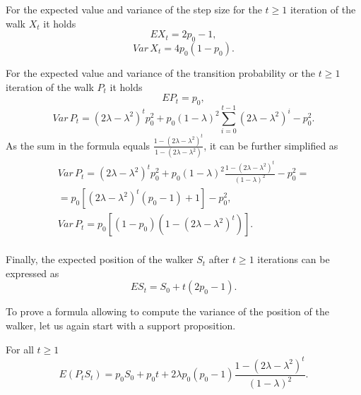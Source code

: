 \documentclass[runningheads]{CMSIM}
\begin{document}
    For the expected value and variance of the step size for the $t\ge1$
    iteration of the walk $X_{t}$ it holds~\cite{ja2019apmat}
    \begin{equation}
        EX_{t}=2p_{0}-1,\label{eq:e_x_t_sr}
    \end{equation}
    \begin{equation}
        Var\,X_{t}=4p_{0}(1-p_{0}).\label{eq:var_x_t_sr}
    \end{equation}

    For the expected value and variance of the transition probability
    or the $t\ge1$ iteration of the walk $P_{t}$ it holds~\cite{ja2019apmat}
    \begin{equation}
        EP_{t}=p_{0},\label{eq:e_p_t_sr}
    \end{equation}
    \begin{equation}
        Var\,P_{t}=(2\lambda-\lambda^{2})^{t}p_{0}^{2}+p_{0}(1-\lambda)^{2}\sum_{i=0}^{t-1}(2\lambda-\lambda^{2})^{i}-p_{0}^{2}.\label{eq:var_p_t_sr}
    \end{equation}
    As the sum in the formula equals $\frac{1-(2\lambda-\lambda^{2})^{t}}{1-(2\lambda-\lambda^{2})}$,
    it can be further simplified as
    \begin{gather*}
        Var\,P_{t}=(2\lambda-\lambda^{2})^{t}p_{0}^{2}+p_{0}(1-\lambda)^{2}\frac{1-(2\lambda-\lambda^{2})^{t}}{(1-\lambda)^{2}}-p_{0}^{2}=\\
        =p_{0}[(2\lambda-\lambda^{2})^{t}(p_{0}-1)+1]-p_{0}^{2},\\
        Var\,P_{t}=p_{0}[(1-p_{0})(1-(2\lambda-\lambda^{2})^{t})].\\
    \end{gather*}

    Finally, the expected position of the walker $S_{t}$ after $t\geq1$
    iterations can be expressed as~\cite{ja2019apmat}
    \begin{equation}
        ES_{t}=S_{0}+t(2p_{0}-1).\label{eq:e_s_t_sr}
    \end{equation}

    To prove a formula allowing to compute the variance of the position
    of the walker, let us again start with a support proposition.
    \begin{proposition}
        For all $t\ge1$
        \begin{equation}
            E(P_{t}S_{t})=p_{0}S_{0}+p_{0}t+2\lambda p_{0}(p_{0}-1)\frac{1-(2\lambda-\lambda^{2})^{t}}{(1-\lambda)^{2}}.\label{eq:e_p_s_t_sr}
        \end{equation}
    \end{proposition}
\end{document}
